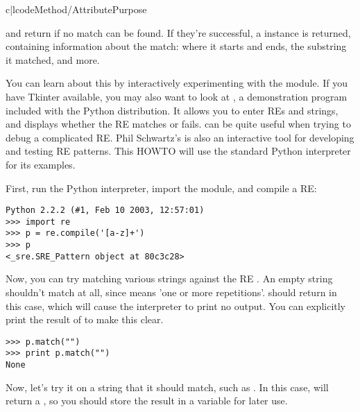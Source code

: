 \documentclass{howto}
\begin{document}
\begin{tableii}{c|l}{code}{Method/Attribute}{Purpose}
\end{tableii}

 and  return  if no match
can be found.  If they're successful, a  instance is
returned, containing information about the match: where it starts and
ends, the substring it matched, and more.

You can learn about this by interactively experimenting with the
 module.  If you have Tkinter available, you may also want
to look at , a demonstration program
included with the Python distribution.  It allows you to enter REs and
strings, and displays whether the RE matches or fails.
 can be quite useful when trying to debug a
complicated RE.  Phil Schwartz's
 is also an interactive
tool for developing and testing RE patterns.  This HOWTO will use the
standard Python interpreter for its examples.

First, run the Python interpreter, import the  module, and
compile a RE:

\begin{verbatim}
Python 2.2.2 (#1, Feb 10 2003, 12:57:01)
>>> import re
>>> p = re.compile('[a-z]+')
>>> p
<_sre.SRE_Pattern object at 80c3c28>
\end{verbatim}

Now, you can try matching various strings against the RE
\regexp{[a-z]+}.  An empty string shouldn't match at all, since
\regexp{+} means 'one or more repetitions'.   should
return  in this case, which will cause the interpreter to
print no output.  You can explicitly print the result of
 to make this clear.

\begin{verbatim}
>>> p.match("")
>>> print p.match("")
None
\end{verbatim}

Now, let's try it on a string that it should match, such as
.  In this case,  will return a
, so you should store the result in a variable for
later use.
\end{document}
